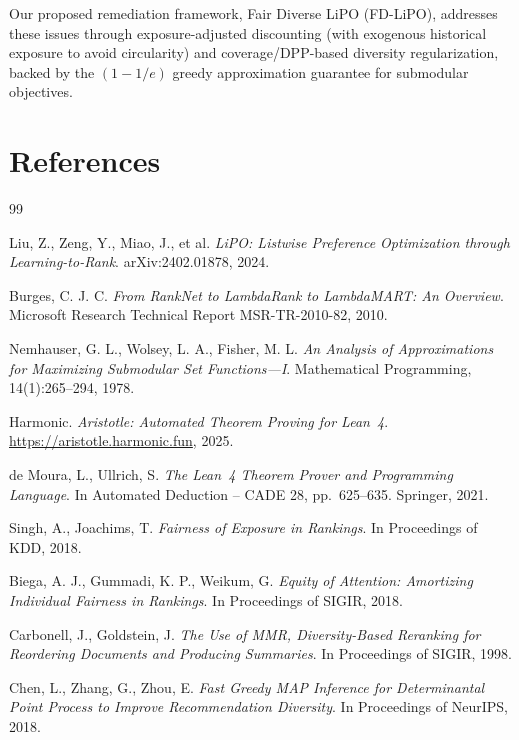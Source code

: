 \documentclass[11pt,a4paper]{article}
\theoremstyle{definition}
\theoremstyle{plain}
\theoremstyle{remark}
\begin{document}
Our proposed remediation framework, Fair Diverse LiPO (FD-LiPO), addresses these issues through exposure-adjusted discounting (with exogenous historical exposure to avoid circularity) and coverage/DPP-based diversity regularization, backed by the $(1 - 1/e)$ greedy approximation guarantee for submodular objectives.

\newpage
\section*{References}

\begin{thebibliography}{99}

Liu, Z., Zeng, Y., Miao, J., et al.
\textit{LiPO: Listwise Preference Optimization through Learning-to-Rank}.
arXiv:2402.01878, 2024.

Burges, C. J. C.
\textit{From RankNet to LambdaRank to LambdaMART: An Overview}.
Microsoft Research Technical Report MSR-TR-2010-82, 2010.

Nemhauser, G. L., Wolsey, L. A., Fisher, M. L.
\textit{An Analysis of Approximations for Maximizing Submodular Set Functions---I}.
Mathematical Programming, 14(1):265--294, 1978.

Harmonic.
\textit{Aristotle: Automated Theorem Proving for Lean~4}.
\url{https://aristotle.harmonic.fun}, 2025.

de Moura, L., Ullrich, S.
\textit{The Lean~4 Theorem Prover and Programming Language}.
In Automated Deduction -- CADE 28, pp.~625--635. Springer, 2021.

Singh, A., Joachims, T.
\textit{Fairness of Exposure in Rankings}.
In Proceedings of KDD, 2018.

Biega, A. J., Gummadi, K. P., Weikum, G.
\textit{Equity of Attention: Amortizing Individual Fairness in Rankings}.
In Proceedings of SIGIR, 2018.

Carbonell, J., Goldstein, J.
\textit{The Use of MMR, Diversity-Based Reranking for Reordering Documents and Producing Summaries}.
In Proceedings of SIGIR, 1998.

Chen, L., Zhang, G., Zhou, E.
\textit{Fast Greedy MAP Inference for Determinantal Point Process to Improve Recommendation Diversity}.
In Proceedings of NeurIPS, 2018.


\end{thebibliography}
\end{document}
